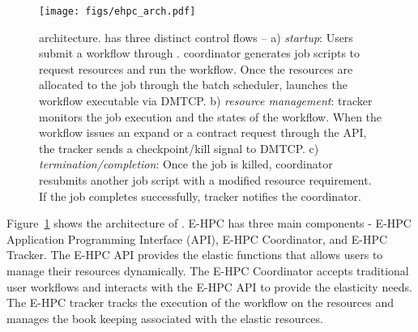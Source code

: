 \begin{figure} [htbp]
\vspace{-0.4cm}
\begin{center}
    \texttt{[image: figs/ehpc\_arch.pdf]}
\end{center}
 \caption{\small \systemname architecture. \systemname has three
 distinct control flows -- a) \emph{startup}: Users submit a workflow
 through \systemname. \systemname coordinator generates job scripts
 to request resources and run the workflow. Once the
 resources are allocated to the job through the batch scheduler,
 \systemname launches the workflow executable via DMTCP. b) \emph{resource management}:
 \systemname tracker monitors the job execution and the states of
 the workflow. When the workflow  issues an expand or a contract request through the
 \systemname API, the tracker sends a checkpoint/kill signal to DMTCP.
 c) \emph{termination/completion}: Once the job is killed, \systemname coordinator
 resubmits another job script with a modified resource requirement. If the job
 completes successfully, \systemname tracker notifies the coordinator.%
 }
 \label{fig:ehpc_arch}
  \vspace{-0.4cm}
\end{figure}


Figure~\ref{fig:ehpc_arch} shows the architecture of
\systemname. E-HPC has three main components - E-HPC Application
Programming Interface (API), E-HPC Coordinator, and E-HPC Tracker. The
E-HPC API provides the elastic functions that allows users to manage
their resources dynamically. The E-HPC Coordinator accepts traditional
user workflows and interacts with the E-HPC API to provide the
elasticity needs. The E-HPC tracker tracks the execution of the
workflow on the resources and manages the book keeping associated
with the elastic resources.

